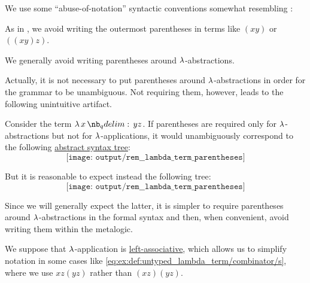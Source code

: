 \begin{remark}\label{rem:lambda_term_parentheses}
  We use some \enquote{abuse-of-notation} syntactic conventions somewhat resembling :
  \begin{thmenum}
     As in , we avoid writing the outermost parentheses in terms like \( (xy) \) or \( ((xy)z) \).

     We generally avoid writing parentheses around \( \mathrm{\lambda} \)-abstractions.

    Actually, it is not necessary to put parentheses around \( \mathrm{\lambda} \)-abstractions in order for the grammar to be unambiguous. Not requiring them, however, leads to the following unintuitive artifact.

    Consider the term \( \qabs x y z \). If parentheses are required only for \( \mathrm{\lambda} \)-abstractions but not for \( \mathrm{\lambda} \)-applications, it would unambiguously correspond to the following \hyperref[rem:lambda_term_ast]{abstract syntax tree}:
    \begin{equation*}
      \texttt{[image: output/rem\_\_lambda\_term\_parentheses]}
    \end{equation*}

    But it is reasonable to expect instead the following tree:
    \begin{equation*}
      \texttt{[image: output/rem\_\_lambda\_term\_parentheses]}
    \end{equation*}

    Since we will generally expect the latter, it is simpler to require parentheses around \( \mathrm{\lambda} \)-abstractions in the formal syntax and then, when convenient, avoid writing them within the metalogic.

     We suppose that \( \mathrm{\lambda} \)-application is \hyperref[rem:binary_operation_syntax_trees/associativity]{left-associative}, which allows us to simplify notation in some cases like \eqref{eq:ex:def:untyped_lambda_term/combinator/s}, where we use \( xz(yz) \) rather than \( (xz)(yz) \).
  \end{thmenum}
\end{remark}

